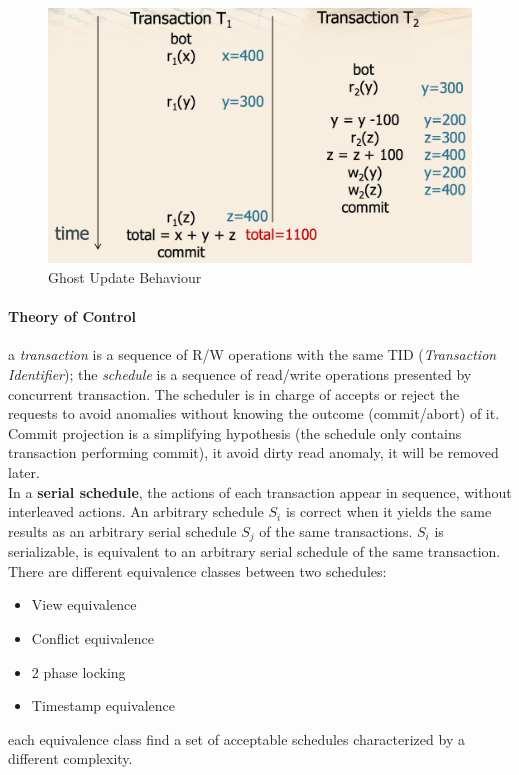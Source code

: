 \documentclass[12pt]{article}
\begin{document}
\begin{figure}[h!]
  \includegraphics[width=\linewidth]{images/ghost_up.png}
  \caption{Ghost Update Behaviour}
  \label{fig:ghost_up}
\end{figure}

\paragraph{Theory of Control} a \textit{transaction} is a sequence of R/W operations with the same TID (\textit{Transaction Identifier}); the \textit{schedule} is a sequence of read/write operations presented by concurrent transaction. The scheduler is in charge of accepts or reject the requests to avoid anomalies without knowing the outcome (commit/abort) of it.\\
Commit projection is a simplifying hypothesis (the schedule only contains transaction performing commit), it avoid dirty read anomaly, it will be removed later.\\
In a \textbf{serial schedule}, the actions of each transaction appear in sequence, without interleaved actions. An arbitrary schedule $S_{i}$ is correct when it yields the same results as an arbitrary serial schedule $S_{j}$ of the same transactions. $S_{i}$ is serializable, is equivalent to an arbitrary serial schedule of the same transaction. There are different equivalence classes between two schedules:
\begin{itemize}
  \item View equivalence
  \item Conflict equivalence
  \item 2 phase locking
  \item Timestamp equivalence
\end{itemize}
each equivalence class find a set of acceptable schedules characterized by a different complexity.
\end{document}
